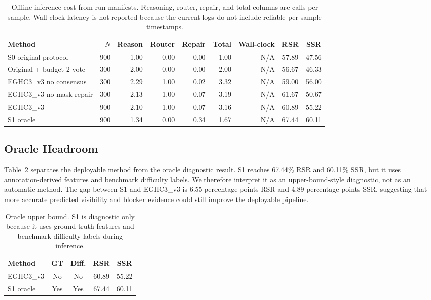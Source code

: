 \begin{table}[t]
\centering
\caption{Offline inference cost from run manifests. Reasoning, router, repair, and total columns are calls per sample. Wall-clock latency is not reported because the current logs do not include reliable per-sample timestamps.}
\label{tab:offline_cost}
\scriptsize
\begin{tabular}{@{}lrrrrrrcc@{}}
\toprule
Method & $N$ & Reason & Router & Repair & Total & Wall-clock & RSR & SSR \\
\midrule
S0 original protocol & 900 & 1.00 & 0.00 & 0.00 & 1.00 & N/A & 57.89 & 47.56 \\
Original + budget-2 vote & 300 & 2.00 & 0.00 & 0.00 & 2.00 & N/A & 56.67 & 46.33 \\
EGHC3\_v3 no consensus & 300 & 2.29 & 1.00 & 0.02 & 3.32 & N/A & 59.00 & 56.00 \\
EGHC3\_v3 no mask repair & 300 & 2.13 & 1.00 & 0.07 & 3.19 & N/A & 61.67 & 50.67 \\
EGHC3\_v3 & 900 & 2.10 & 1.00 & 0.07 & 3.16 & N/A & 60.89 & 55.22 \\
S1 oracle & 900 & 1.34 & 0.00 & 0.34 & 1.67 & N/A & 67.44 & 60.11 \\
\bottomrule
\end{tabular}
\end{table}

\subsection{Oracle Headroom}

Table~\ref{tab:oracle} separates the deployable method from the oracle diagnostic result. S1 reaches 67.44\% RSR and 60.11\% SSR, but it uses annotation-derived features and benchmark difficulty labels. We therefore interpret it as an upper-bound-style diagnostic, not as an automatic method. The gap between S1 and EGHC3\_v3 is 6.55 percentage points RSR and 4.89 percentage points SSR, suggesting that more accurate predicted visibility and blocker evidence could still improve the deployable pipeline.

\begin{table}[t]
\centering
\caption{Oracle upper bound. S1 is diagnostic only because it uses ground-truth features and benchmark difficulty labels during inference.}
\label{tab:oracle}
\small
\begin{tabular}{@{}lcccc@{}}
\toprule
Method & GT & Diff. & RSR & SSR \\
\midrule
EGHC3\_v3 & No & No & 60.89 & 55.22 \\
S1 oracle & Yes & Yes & 67.44 & 60.11 \\
\bottomrule
\end{tabular}
\end{table}

